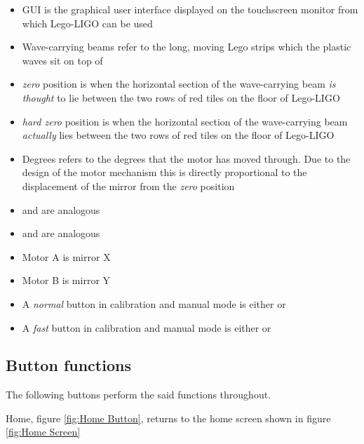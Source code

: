 \documentclass[a4paper, 12pt]{book}
\begin{document}
\begin{itemize}
\item GUI is the graphical user interface displayed on the touchscreen monitor from which Lego-LIGO can be used

\item Wave-carrying beams refer to the long, moving Lego strips which the plastic waves sit on top of

\item \textit{zero} position is when the horizontal section of the wave-carrying beam \textit{is thought} to lie between the two rows of red tiles on the floor of Lego-LIGO

\item \textit{hard zero} position is when the horizontal section of the wave-carrying beam \textit{actually} lies between the two rows of red tiles on the floor of Lego-LIGO

\item Degrees refers to the degrees that the motor has moved through. Due to the design of the motor mechanism this is directly proportional to the displacement of the mirror from the \textit{zero} position

\item {} and  are analogous

\item {} and  are analogous

\item Motor A is mirror X

\item Motor B is mirror Y

\item A \textit{normal} button in calibration and manual mode is either  or 

\item A \textit{fast} button in calibration and manual mode is either  or 

\end{itemize}

\subsection{Button functions}
The following buttons perform the said functions throughout.

Home, figure \ref{fig:Home Button}, returns to the home screen shown in figure \ref{fig:Home Screen}
\end{document}
